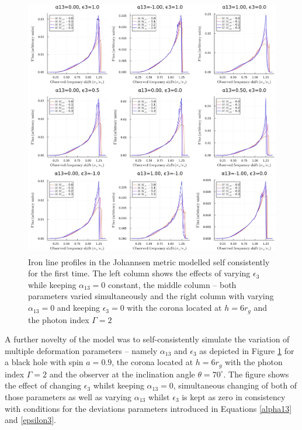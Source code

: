 \documentclass[fleqn,usenatbib,useAMS]{mnras}
\begin{document}
\begin{figure}
    \centering
    \includegraphics[width=0.98\linewidth]{figures/johannsen_deformation.png}
    \caption{Iron line profiles in the Johannsen metric modelled self consistently for the first time. The left column shows the effects of varying $\epsilon_{3}$ while keeping $\alpha_{13} = 0$ constant, the middle column -- both parameters varied simultaneously and the right column with varying $\alpha_{13} = 0$ and keeping $\epsilon_{3} = 0$ with the corona located at $h = 6 r_{g}$ and the photon index $\Gamma = 2$}
    \label{johannsen_deformation}
\end{figure}

A further novelty of the model was to self-consistently simulate the variation of multiple deformation parameters -- namely $\alpha_{13}$ and $\epsilon_{3}$ as depicted in Figure \ref{johannsen_deformation} for a black hole with spin $a = 0.9$, the corona located at $h = 6 r_{g}$ with the photon index $\Gamma = 2$ and the observer at the inclination angle $\theta = 70^{\circ}$. The figure shows the effect of changing $\epsilon_{3}$ whilst keeping $\alpha_{13} = 0$, simultaneous changing of both of those parameters as well as varying $\alpha_{13}$ whilst $\epsilon_{3}$ is kept as zero in consistency with conditions for the deviations parameters introduced in Equations \ref{alpha13} and \ref{epsilon3}. 
\end{document}
